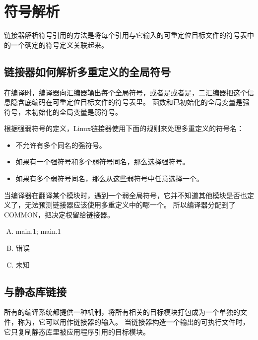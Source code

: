 
\section{符号解析}
{
    链接器解析符号引用的方法是将每个引用与它输入的可重定位目标文件的符号表中的一个确定的符号定义关联起来。

    \subsection{链接器如何解析多重定义的全局符号}
    {
        在编译时，编译器向汇编器输出每个全局符号，或者是或者是，二汇编器把这个信息隐含底编码在可重定位目标文件的符号表里。
        函数和已初始化的全局变量是强符号，未初始化的全局变量是弱符号。

        根据强弱符号的定义，Linux链接器使用下面的规则来处理多重定义的符号名：

        \begin{itemize}
            \item 不允许有多个同名的强符号。
            \item 如果有一个强符号和多个弱符号同名，那么选择强符号。
            \item 如果有多个弱符号同名，那么从这些弱符号中任意选择一个。
        \end{itemize}

        当编译器在翻译某个模块时，遇到一个弱全局符号，它并不知道其他模块是否也定义了，无法预测链接器应该使用多重定义中的哪一个。
        所以编译器分配到了COMMON，把决定权留给链接器。

        \begin{practicec}
            \begin{enumerate}[A.]
                \item main.1; main.1
                \item 错误
                \item 未知
            \end{enumerate}
        \end{practicec}
    }

    \subsection{与静态库链接}
    {
        所有的编译系统都提供一种机制，将所有相关的目标模块打包成为一个单独的文件，称为，它可以用作链接器的输入。
        当链接器构造一个输出的可执行文件时，它只复制静态库里被应用程序引用的目标模块。

}}
